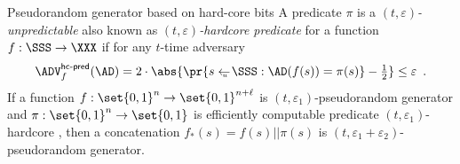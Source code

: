 \documentclass{crypto-exercise}
\author{Sven Laur}
\begin{document}
\begin{exercise}{Pseudorandom generator based on hard-core bits}
  A predicate $\pi$ is a \emph{$(t,\varepsilon)$-unpredictable} also
  known as \emph{$(t,\varepsilon)$-hardcore predicate} for a function
  $f:\SSS\to\XXX$ if for any $t$-time adversary
  \begin{align*}
    \advHCPredXX{f}{\AD}%
    =2\cdot\abs{\pr{s\getsu\SSS:\AD(f(s))=\pi(s)}-{\textstyle\frac{1}{2}}}\leq\varepsilon\enspace.
  \end{align*}
   If a function $f:\set{0,1}^n\to\set{0,1}^{n+\ell}$
    is $(t,\varepsilon_1)$-pseudorandom generator and
    $\pi:\set{0,1}^n\to\set{0,1}$ is efficiently computable predicate
    $(t,\varepsilon_1)$-hardcore , then a concatenation
    $f_*(s)=f(s)||\pi(s)$ is
    $(t,\varepsilon_1+\varepsilon_2)$-pseudorandom generator.
\end{exercise}
\begin{solution}
\end{solution}
\end{document}
